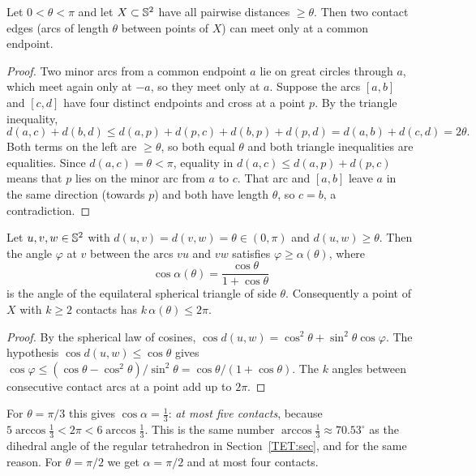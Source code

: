 \begin{lemma}\label{COMP:lem:planar}
Let $0<\theta<\pi$ and let $X\subset\mathbb{S}^2$ have all pairwise distances $\ge\theta$. Then two contact
edges (arcs of length $\theta$ between points of $X$) can meet only at a common endpoint.
\end{lemma}

\begin{proof}
Two minor arcs from a common endpoint $a$ lie on great circles through $a$, which meet again only at
$-a$, so they meet only at $a$. Suppose the arcs $[a,b]$ and $[c,d]$ have four distinct endpoints and
cross at a point $p$. By the triangle inequality,
\[
  d(a,c)+d(b,d)\le d(a,p)+d(p,c)+d(b,p)+d(p,d)=d(a,b)+d(c,d)=2\theta .
\]
Both terms on the left are $\ge\theta$, so both equal $\theta$ and both triangle inequalities are
equalities. Since $d(a,c)=\theta<\pi$, equality in $d(a,c)\le d(a,p)+d(p,c)$ means that $p$ lies on the
minor arc from $a$ to $c$. That arc and $[a,b]$ leave $a$ in the same direction (towards $p$) and both
have length $\theta$, so $c=b$, a contradiction.
\end{proof}

\begin{lemma}\label{COMP:lem:angle}
Let $u,v,w\in\mathbb{S}^2$ with $d(u,v)=d(v,w)=\theta\in(0,\pi)$ and $d(u,w)\ge\theta$. Then the angle
$\varphi$ at $v$ between the arcs $vu$ and $vw$ satisfies $\varphi\ge\alpha(\theta)$, where
\[
  \cos\alpha(\theta)=\frac{\cos\theta}{1+\cos\theta}
\]
is the angle of the equilateral spherical triangle of side $\theta$. Consequently a point of $X$ with
$k\ge2$ contacts has $k\,\alpha(\theta)\le2\pi$.
\end{lemma}

\begin{proof}
By the spherical law of cosines, $\cos d(u,w)=\cos^2\theta+\sin^2\theta\cos\varphi$. The hypothesis
$\cos d(u,w)\le\cos\theta$ gives
$\cos\varphi\le(\cos\theta-\cos^2\theta)/\sin^2\theta=\cos\theta/(1+\cos\theta)$. The $k$ angles between
consecutive contact arcs at a point add up to $2\pi$.
\end{proof}

For $\theta=\pi/3$ this gives $\cos\alpha=\frac13$: \emph{at most five contacts}, because
$5\arccos\frac13<2\pi<6\arccos\frac13$. This is the same number $\arccos\frac13\approx70.53^\circ$ as the
dihedral angle of the regular tetrahedron in Section~\ref{TET:sec}, and for the same reason. For
$\theta=\pi/2$ we get $\alpha=\pi/2$ and at most four contacts.


